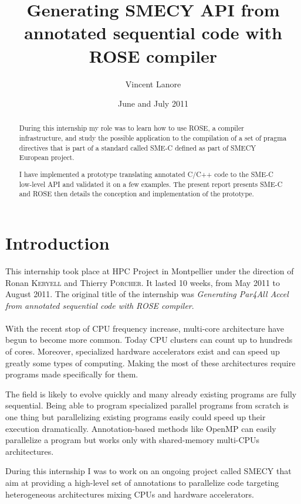 \documentclass[a4paper]{article}
\title{Generating SMECY API from annotated sequential code with ROSE compiler}
\author{Vincent \sc Lanore}
\date{June and July 2011}
\begin{document}
	\maketitle
	
	\begin{abstract}
		During this internship my role was to learn how to use ROSE, a
        compiler infrastructure, and study the possible application to the
        compilation of a set of pragma directives that is part of a
        standard called SME-C defined as part of SMECY European project.
		
		I have implemented a prototype translating annotated C/C++ code to the SME-C low-level API and validated it on a few examples. The present report presents SME-C and ROSE then details the conception and implementation of the prototype.
	\end{abstract}
	
	\newpage
	\tableofcontents
	\newpage
	
\section*{Introduction}
	This internship took place at HPC Project in Montpellier under the
    direction of Ronan \textsc{Keryell} and Thierry \textsc{Porcher}. It lasted 10 weeks, from May 2011 to August 2011. The original title of the internship was \emph{Generating Par4All Accel from annotated sequential code with ROSE compiler}.
	
	\paragraph{}With the recent stop of CPU frequency increase, multi-core architecture have begun to become more common. Today CPU clusters can count up to hundreds of cores. Moreover, specialized hardware accelerators exist and can speed up greatly some types of computing.  Making the most of these architectures require programs made specifically for them. 
	
	The field is likely to evolve quickly and many already existing programs are fully sequential. Being able to program specialized parallel programs from scratch is one thing but parallelizing existing programs easily could speed up their execution dramatically. Annotation-based methods like OpenMP can easily parallelize a program but works only with shared-memory multi-CPUs architectures.
	
	During this internship I was to work on an ongoing project called SMECY that aim at providing a high-level set of annotations to parallelize code targeting heterogeneous architectures mixing CPUs and hardware accelerators.
	
\end{document}
